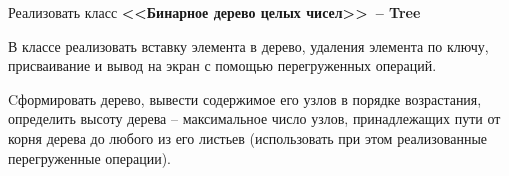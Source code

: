 Реализовать класс \textbf{<<Бинарное дерево целых чисел>>~-- Tree}


В классе реализовать вставку элемента в дерево,
удаления элемента по ключу, присваивание и вывод на экран с помощью перегруженных
операций.

Cформировать дерево, вывести содержимое его узлов в порядке возрастания,
определить высоту дерева – максимальное число узлов, принадлежащих пути от корня
дерева до любого из его листьев (использовать при этом реализованные перегруженные
операции).
